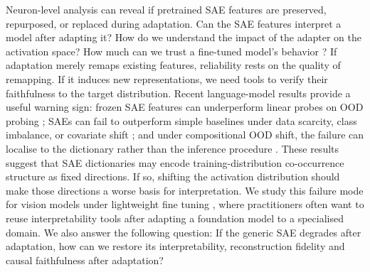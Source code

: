 Neuron-level analysis can reveal if pretrained SAE features are preserved, repurposed, or replaced during adaptation. Can the SAE features interpret a model after adapting it? How do we understand the impact of the adapter on the activation space? How much can we trust a fine-tuned model's behavior \citep{durrani2020analyzing, csiszarik2021similarity}? If adaptation merely remaps existing features, reliability rests on the quality of remapping.  If it induces new representations, we need tools to verify their faithfulness to the target distribution. Recent language-model results provide a useful warning sign: frozen SAE features can underperform linear probes on OOD probing \citep{smith2025negative}; SAEs can fail to outperform simple baselines under data scarcity, class imbalance, or covariate shift \citep{kantamneni2025sparse}; and under compositional OOD shift, the failure can localise to the dictionary rather than the inference procedure \citep{pacela2026stopprobingstartcoding}.
These results suggest that SAE dictionaries may encode training-distribution co-occurrence structure as fixed directions. If so, shifting the activation distribution should make those directions a worse basis for interpretation. {We study this failure mode for vision models under lightweight fine tuning }, where practitioners often want to reuse interpretability tools after adapting a foundation model to a specialised domain. We also answer the following question: If the generic SAE degrades after adaptation, how can we restore its interpretability, reconstruction fidelity and causal faithfulness after adaptation?

